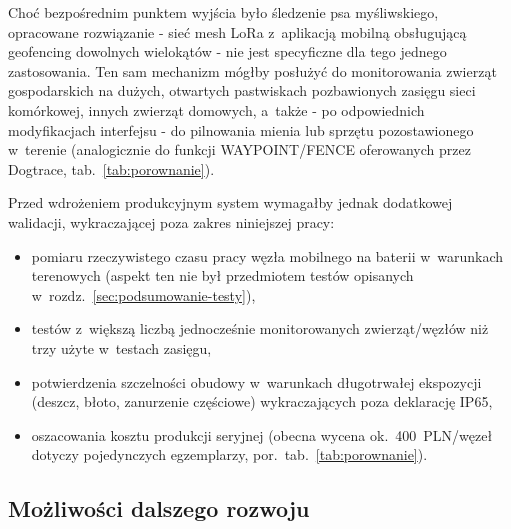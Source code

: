 Choć bezpośrednim punktem wyjścia było śledzenie psa myśliwskiego, opracowane rozwiązanie -
sieć mesh LoRa z~aplikacją mobilną obsługującą geofencing dowolnych wielokątów - nie jest
specyficzne dla tego jednego zastosowania. Ten sam mechanizm mógłby posłużyć do monitorowania
zwierząt gospodarskich na dużych, otwartych pastwiskach pozbawionych zasięgu sieci komórkowej,
innych zwierząt domowych, a~także - po odpowiednich modyfikacjach interfejsu - do pilnowania mienia
lub sprzętu pozostawionego w~terenie (analogicznie do funkcji WAYPOINT/FENCE oferowanych przez
Dogtrace, tab.~\ref{tab:porownanie}).

Przed wdrożeniem produkcyjnym system wymagałby jednak dodatkowej walidacji, wykraczającej poza
zakres niniejszej pracy:
\begin{itemize}
    \item pomiaru rzeczywistego czasu pracy węzła mobilnego na baterii w~warunkach terenowych
          (aspekt ten nie był przedmiotem testów opisanych w~rozdz.~\ref{sec:podsumowanie-testy}),
    \item testów z~większą liczbą jednocześnie monitorowanych zwierząt/węzłów niż trzy użyte
          w~testach zasięgu,
    \item potwierdzenia szczelności obudowy w~warunkach długotrwałej ekspozycji (deszcz, błoto,
          zanurzenie częściowe) wykraczających poza deklarację IP65,
    \item oszacowania kosztu produkcji seryjnej (obecna wycena ok.\ 400~PLN/węzeł dotyczy
          pojedynczych egzemplarzy, por.\ tab.~\ref{tab:porownanie}).
\end{itemize}

\newpage
\subsection*{Możliwości dalszego rozwoju}

